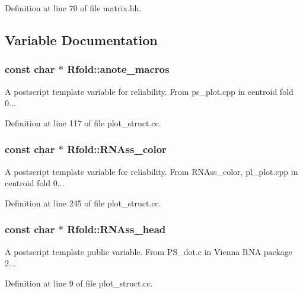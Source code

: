 Definition at line 70 of file matrix.\+hh.



\subsection{Variable Documentation}
\hypertarget{namespace_rfold_a021c8cd72fb29fa8491544b7eb90110e}{
\subsubsection[{anote\+\_\+macros}]{\setlength{\rightskip}{0pt plus 5cm}const char $\ast$ Rfold\+::anote\+\_\+macros}}\label{namespace_rfold_a021c8cd72fb29fa8491544b7eb90110e}
A postscript template variable for reliability. From ps\+\_\+plot.\+cpp in centroid fold 0... 

Definition at line 117 of file plot\+\_\+struct.\+cc.

\hypertarget{namespace_rfold_a932e8cd670479c52a8d791ec7377ff87}{
\subsubsection[{R\+N\+Ass\+\_\+color}]{\setlength{\rightskip}{0pt plus 5cm}const char $\ast$ Rfold\+::\+R\+N\+Ass\+\_\+color}}\label{namespace_rfold_a932e8cd670479c52a8d791ec7377ff87}
A postscript template variable for reliability. From R\+N\+Ass\+\_\+color, pl\+\_\+plot.\+cpp in centroid fold 0... 

Definition at line 245 of file plot\+\_\+struct.\+cc.

\hypertarget{namespace_rfold_ab54ee07a82c4554e95d1149302e034a8}{
\subsubsection[{R\+N\+Ass\+\_\+head}]{\setlength{\rightskip}{0pt plus 5cm}const char $\ast$ Rfold\+::\+R\+N\+Ass\+\_\+head}}\label{namespace_rfold_ab54ee07a82c4554e95d1149302e034a8}
A postscript template public variable. From P\+S\+\_\+dot.\+c in Vienna R\+N\+A package 2... 

Definition at line 9 of file plot\+\_\+struct.\+cc.


